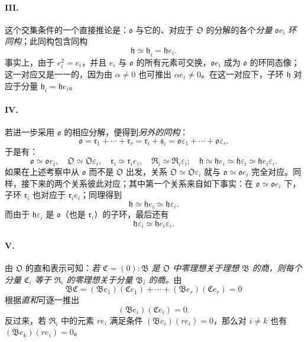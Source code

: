 \paragraph{III.}
这个交集条件的一个直接推论是：$\mathfrak o$ 与它的、对应于 $\mathfrak O$ 的分解的各个\emph{分量} $\mathfrak o e_i$ \emph{环同构}；此同构包含同构
\[
\mathfrak h\simeq\mathfrak h_i=\mathfrak h e_i.
\]
事实上，由于 $e_i^2=e_i$，并且 $e_i$ 与 $\mathfrak o$ 的所有元素可交换，$\mathfrak o e_i$ 成为 $\mathfrak o$ 的环同态像；这一对应又是一一的，因为由 $\alpha\ne0$ 也可推出 $\alpha e_i\ne0$。在这一对应下，子环 $\mathfrak h$ 对应于分量 $\mathfrak h_i=\mathfrak h e_i$。

\paragraph{IV.}
若进一步采用 $\mathfrak o$ 的相应分解，便得到\emph{另外的同构}：
\[
\mathfrak o=\mathfrak r_1+\cdots+\mathfrak r_r
=\mathfrak r_i+\mathfrak s_i
=\mathfrak o\varepsilon_1+\cdots+\mathfrak o\varepsilon_r.
\]
于是有：
\[
\mathfrak o\simeq\mathfrak o e_i,
\quad \mathfrak O\simeq\mathfrak O\varepsilon_i,
\quad \mathfrak r_i\simeq\mathfrak r_i e_i,
\quad \mathfrak R_i\simeq\mathfrak R_i\varepsilon_i;
\quad \mathfrak h\simeq\mathfrak h e_i\simeq\mathfrak h\varepsilon_i\simeq\mathfrak h e_i\varepsilon_i.
\]
如果在上述考察中从 $\mathfrak o$ 而不是 $\mathfrak O$ 出发，关系 $\mathfrak O\simeq\mathfrak O\varepsilon_i$ 就与 $\mathfrak o\simeq\mathfrak o e_i$ 完全对应。同样，接下来的两个关系彼此对应；其中第一个关系来自如下事实：在 $\mathfrak o\simeq\mathfrak o e_i$ 下，子环 $\mathfrak r_i$ 也对应于 $\mathfrak r_i e_i$；同理得到
\[
\mathfrak h\simeq\mathfrak h e_i\simeq\mathfrak h\varepsilon_i.
\]
而由于 $\mathfrak h\varepsilon_i$ 是 $\mathfrak o$（也是 $\mathfrak r_i$）的子环，最后还有
\[
\mathfrak h\varepsilon_i\simeq\mathfrak h e_i\varepsilon_i.
\]

\paragraph{V.}
由 $\mathfrak O$ 的直和表示可知：\emph{若 $\mathfrak C=(0):\mathfrak B$ 是 $\mathfrak O$ 中零理想关于理想 $\mathfrak B$ 的商，则每个分量 $\mathfrak C_i$ 等于 $\mathfrak R_i$ 的零理想关于分量 $\mathfrak B_i$ 的商。}由
\[
\mathfrak B\mathfrak C=(\mathfrak B e_1)(\mathfrak C e_1)+\cdots+(\mathfrak B e_r)(\mathfrak C e_r)=0
\]
根据\emph{直和}可逐一推出
\[
(\mathfrak B e_i)(\mathfrak C e_i)=0.
\]
反过来，若 $\mathfrak R_i$ 中的元素 $r e_i$ 满足条件 $(\mathfrak B e_i)(r e_i)=0$，那么对 $i\ne k$ 也有 $(\mathfrak B e_k)(r e_i)=0$。

